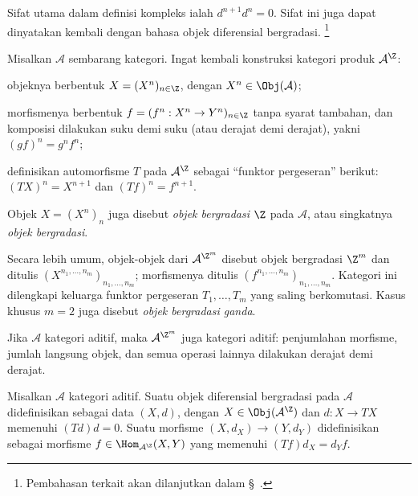 Sifat utama dalam definisi kompleks ialah $d^{n+1}d^n=0$. Sifat ini juga dapat
dinyatakan kembali dengan bahasa objek diferensial bergradasi.%
\footnote{Pembahasan terkait akan dilanjutkan dalam
\S~.}

\begin{definisi}\label{def:graded-obj}
	Misalkan $\mathcal{A}$ sembarang kategori. Ingat kembali konstruksi kategori
	produk $\mathcal{A}^{\Z}$:
	\begin{compactitem}
		\item objeknya berbentuk $X=(X^n)_{n\in\Z}$, dengan
		$X^n\in\Obj(\mathcal{A})$;
		\item morfismenya berbentuk
		$f=(f^n:X^n\to Y^n)_{n\in\Z}$ tanpa syarat tambahan, dan komposisi
		dilakukan suku demi suku (atau derajat demi derajat), yakni
		$(gf)^n=g^nf^n$;
		\item definisikan automorfisme $T$ pada $\mathcal{A}^{\Z}$ sebagai
		``funktor pergeseran'' berikut:
		$(TX)^n=X^{n+1}$ dan $(Tf)^n=f^{n+1}$.
	\end{compactitem}
	Objek $X=(X^n)_n$ juga disebut \emph{objek bergradasi $\Z$} pada
	$\mathcal{A}$, atau singkatnya \emph{objek bergradasi}.

	Secara lebih umum, objek-objek dari $\mathcal{A}^{\Z^m}$ disebut objek
	bergradasi $\Z^m$ dan ditulis
	$(X^{n_1,\ldots,n_m})_{n_1,\ldots,n_m}$; morfismenya ditulis
	$(f^{n_1,\ldots,n_m})_{n_1,\ldots,n_m}$. Kategori ini dilengkapi keluarga
	funktor pergeseran $T_1,\ldots,T_m$ yang saling berkomutasi. Kasus khusus
	$m=2$ juga disebut \emph{objek bergradasi ganda}.
\end{definisi}

Jika $\mathcal{A}$ kategori aditif, maka $\mathcal{A}^{\Z^m}$ juga kategori
aditif: penjumlahan morfisme, jumlah langsung objek, dan semua operasi lainnya
dilakukan derajat demi derajat.

\begin{definisi}
	Misalkan $\mathcal{A}$ kategori aditif. Suatu objek diferensial bergradasi
	pada $\mathcal{A}$ didefinisikan sebagai data $(X,d)$, dengan
	$X\in\Obj(\mathcal{A}^{\Z})$ dan $d:X\to TX$ memenuhi $(Td)d=0$. Suatu
	morfisme $(X,d_X)\to(Y,d_Y)$ didefinisikan sebagai morfisme
	$f\in\Hom_{\mathcal{A}^{\Z}}(X,Y)$ yang memenuhi $(Tf)d_X=d_Yf$.
\end{definisi}

